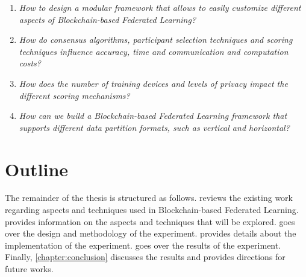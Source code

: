 \todo{}

\begin{enumerate}
    \item \textit{How to design a modular framework that allows to easily customize different aspects of Blockchain-based Federated Learning?}
    
    \item \textit{How do consensus algorithms, participant selection techniques and scoring techniques influence accuracy, time and communication and computation costs?}
    
    \item \textit{How does the number of training devices and levels of privacy impact the different scoring mechanisms?}
    
    \item \textit{How can we build a Blockchain-based Federated Learning framework that supports different data partition formats, such as vertical and horizontal?}
\end{enumerate}

\section{Outline}

The remainder of the thesis is structured as follows.  reviews the existing work regarding aspects and techniques used in Blockchain-based Federated Learning.  provides information on the aspects and techniques that will be explored.  goes over the design and methodology of the experiment.  provides details about the implementation of the experiment.  goes over the results of the experiment. Finally, \cref{chapter:conclusion} discusses the results and provides directions for future works.

